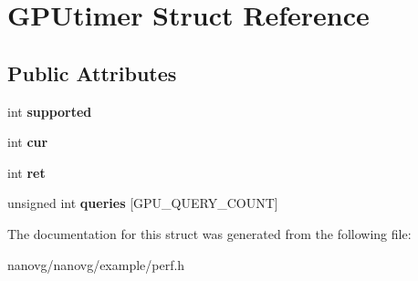 \hypertarget{struct_g_p_utimer}{\section{G\+P\+Utimer Struct Reference}
\label{struct_g_p_utimer}
}
\subsection*{Public Attributes}
\begin{DoxyCompactItemize}
\item 
\hypertarget{struct_g_p_utimer_ab54d9f4fe1fc810f9e8d736bf9381826}{int {\bfseries supported}}\label{struct_g_p_utimer_ab54d9f4fe1fc810f9e8d736bf9381826}

\item 
\hypertarget{struct_g_p_utimer_ac75c6fd1ca2bbd22f4f3155f06a2fffb}{int {\bfseries cur}}\label{struct_g_p_utimer_ac75c6fd1ca2bbd22f4f3155f06a2fffb}

\item 
\hypertarget{struct_g_p_utimer_aa28be2ddd179ec58bb62561770ee361c}{int {\bfseries ret}}\label{struct_g_p_utimer_aa28be2ddd179ec58bb62561770ee361c}

\item 
\hypertarget{struct_g_p_utimer_a19f7265e63c7f0ca32dcc432e975e88c}{unsigned int {\bfseries queries} \mbox{[}G\+P\+U\+\_\+\+Q\+U\+E\+R\+Y\+\_\+\+C\+O\+U\+N\+T\mbox{]}}\label{struct_g_p_utimer_a19f7265e63c7f0ca32dcc432e975e88c}

\end{DoxyCompactItemize}


The documentation for this struct was generated from the following file\+:\begin{DoxyCompactItemize}
\item 
nanovg/nanovg/example/perf.\+h\end{DoxyCompactItemize}
